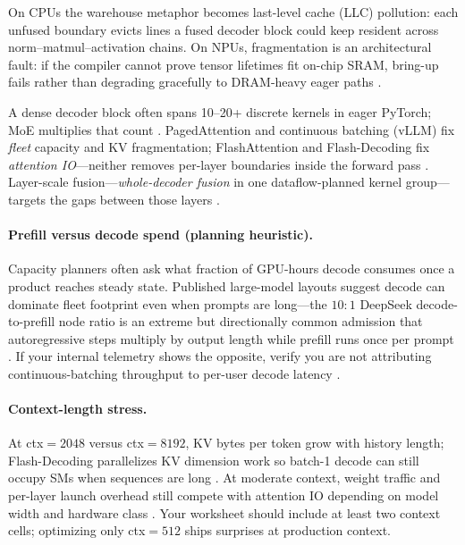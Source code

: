 On CPUs the warehouse metaphor becomes last-level cache (LLC) pollution: each unfused boundary evicts lines a fused decoder block could keep resident across norm--matmul--activation chains.
On NPUs, fragmentation is an architectural fault: if the compiler cannot prove tensor lifetimes fit on-chip SRAM, bring-up fails rather than degrading gracefully to DRAM-heavy eager paths \citep{amd2024xdna,yirage2026}.

A dense decoder block often spans 10--20+ discrete kernels in eager PyTorch; MoE multiplies that count \citep{taxbreak2026}.
PagedAttention and continuous batching (vLLM) fix \emph{fleet} capacity and KV fragmentation; FlashAttention and Flash-Decoding fix \emph{attention IO}---neither removes per-layer boundaries inside the forward pass \citep{kwon2023vllm,dao2022flashattention,dao2023flashdecoding}.
Layer-scale  fusion---\emph{whole-decoder fusion} in one dataflow-planned kernel group---targets the gaps between those layers \citep{yirage2026,chen2020compilerbasedhardw}.


\paragraph{Prefill versus decode spend (planning heuristic).}
Capacity planners often ask what fraction of GPU-hours decode consumes once a product reaches steady state.
Published large-model layouts suggest decode can dominate fleet footprint even when prompts are long---the $10{:}1$ DeepSeek decode-to-prefill node ratio is an extreme but directionally common admission that autoregressive steps multiply by output length while prefill runs once per prompt \citep{patel2025llminference,wang2025pdacca541tokenssll}.
If your internal telemetry shows the opposite, verify you are not attributing continuous-batching throughput to per-user decode latency \citep{kwon2023vllm,chen2026towardshighgoodput}.

\paragraph{Context-length stress.}
At ctx${=}2048$ versus ctx${=}8192$, KV bytes per token grow with history length; Flash-Decoding parallelizes KV dimension work so batch-1 decode can still occupy SMs when sequences are long \citep{dao2023flashdecoding}.
At moderate context, weight traffic and per-layer launch overhead still compete with attention IO depending on model width and hardware class \citep{memoryfloor2026,taxbreak2026}.
Your worksheet should include at least two context cells; optimizing only ctx${=}512$ ships surprises at production context.


